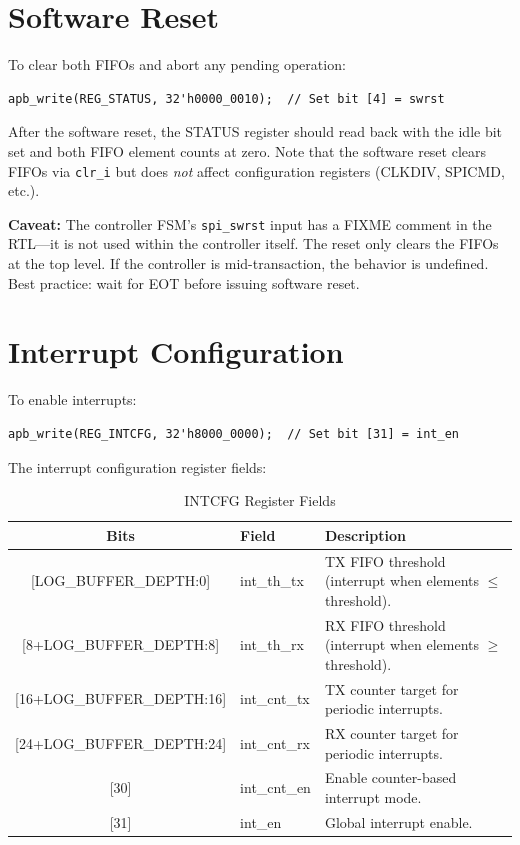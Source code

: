 \section{Software Reset}

To clear both FIFOs and abort any pending operation:
\begin{lstlisting}
apb_write(REG_STATUS, 32'h0000_0010);  // Set bit [4] = swrst
\end{lstlisting}

After the software reset, the STATUS register should read back with the idle bit set and both
FIFO element counts at zero. Note that the software reset clears FIFOs via \texttt{clr\_i} but
does \emph{not} affect configuration registers (CLKDIV, SPICMD, etc.).

\textbf{Caveat:} The controller FSM's \texttt{spi\_swrst} input has a FIXME comment in the
RTL---it is not used within the controller itself. The reset only clears the FIFOs at the
top level. If the controller is mid-transaction, the behavior is undefined. Best practice:
wait for EOT before issuing software reset.

\section{Interrupt Configuration}

To enable interrupts:
\begin{lstlisting}
apb_write(REG_INTCFG, 32'h8000_0000);  // Set bit [31] = int_en
\end{lstlisting}

The interrupt configuration register fields:
\begin{table}[H]
\centering
\caption{INTCFG Register Fields}
\begin{tabularx}{\textwidth}{@{}clX@{}}
\toprule
\textbf{Bits} & \textbf{Field} & \textbf{Description} \\
\midrule
{[LOG\_BUFFER\_DEPTH:0]}     & int\_th\_tx  & TX FIFO threshold (interrupt when elements $\leq$ threshold). \\
{[8+LOG\_BUFFER\_DEPTH:8]}   & int\_th\_rx  & RX FIFO threshold (interrupt when elements $\geq$ threshold). \\
{[16+LOG\_BUFFER\_DEPTH:16]} & int\_cnt\_tx & TX counter target for periodic interrupts. \\
{[24+LOG\_BUFFER\_DEPTH:24]} & int\_cnt\_rx & RX counter target for periodic interrupts. \\
{[30]}                       & int\_cnt\_en & Enable counter-based interrupt mode. \\
{[31]}                       & int\_en      & Global interrupt enable. \\
\bottomrule
\end{tabularx}
\end{table}

